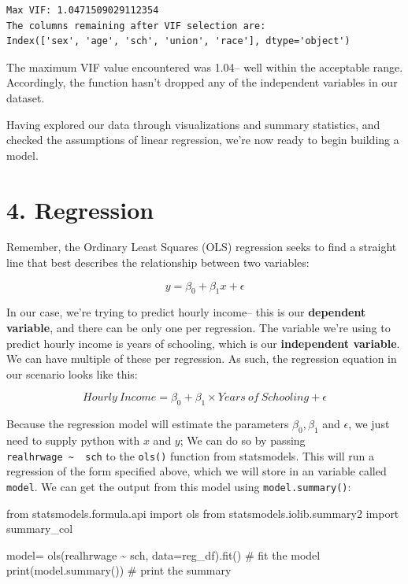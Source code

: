 \documentclass[
  letterpaper,
  DIV=11,
  numbers=noendperiod]{scrreprt}
\newenvironment{Shaded}{\begin{snugshade}}{\end{snugshade}}
\newcommand{\BuiltInTok}[1]{\textcolor[rgb]{0.00,0.23,0.31}{#1}}
\newcommand{\CommentTok}[1]{\textcolor[rgb]{0.37,0.37,0.37}{#1}}
\newcommand{\ImportTok}[1]{\textcolor[rgb]{0.00,0.46,0.62}{#1}}
\newcommand{\NormalTok}[1]{\textcolor[rgb]{0.00,0.23,0.31}{#1}}
\newcommand{\OperatorTok}[1]{\textcolor[rgb]{0.37,0.37,0.37}{#1}}
\newcommand{\StringTok}[1]{\textcolor[rgb]{0.13,0.47,0.30}{#1}}
\begin{document}
\begin{verbatim}
Max VIF: 1.0471509029112354
The columns remaining after VIF selection are:
Index(['sex', 'age', 'sch', 'union', 'race'], dtype='object')
\end{verbatim}

The maximum VIF value encountered was 1.04-- well within the acceptable
range. Accordingly, the function hasn't dropped any of the independent
variables in our dataset.

Having explored our data through visualizations and summary statistics,
and checked the assumptions of linear regression, we're now ready to
begin building a model.

\hypertarget{regression-1}{%
\section{4. Regression}\label{regression-1}}

Remember, the Ordinary Least Squares (OLS) regression seeks to find a
straight line that best describes the relationship between two
variables:

\[y= \beta_0 + \beta_1x+\epsilon \]

In our case, we're trying to predict hourly income-- this is our
\textbf{dependent variable}, and there can be only one per regression.
The variable we're using to predict hourly income is years of schooling,
which is our \textbf{independent variable}. We can have multiple of
these per regression. As such, the regression equation in our scenario
looks like this:

\[Hourly\ Income= \beta_0 + \beta_1 \times Years\ of\ Schooling +\epsilon \]

Because the regression model will estimate the parameters
\(\beta_0, \beta_1\) and \(\epsilon\), we just need to supply python
with \(x\) and \(y\); We can do so by passing
\texttt{realhrwage\ \textasciitilde{}\ \ sch} to the \texttt{ols()}
function from statsmodels. This will run a regression of the form
specified above, which we will store in an variable called
\texttt{model}. We can get the output from this model using
\texttt{model.summary()}:

\begin{Shaded}
\begin{Highlighting}[]
\ImportTok{from}\NormalTok{ statsmodels.formula.api }\ImportTok{import}\NormalTok{ ols}
\ImportTok{from}\NormalTok{ statsmodels.iolib.summary2 }\ImportTok{import}\NormalTok{ summary\_col}

\NormalTok{model}\OperatorTok{=}\NormalTok{ ols(}\StringTok{\textquotesingle{}realhrwage \textasciitilde{}  sch\textquotesingle{}}\NormalTok{, data}\OperatorTok{=}\NormalTok{reg\_df).fit() }\CommentTok{\# fit the model}
\BuiltInTok{print}\NormalTok{(model.summary()) }\CommentTok{\# print the summary}
\end{Highlighting}
\end{Shaded}
\end{document}
